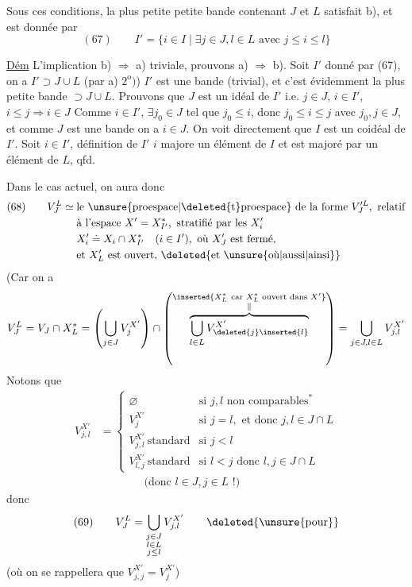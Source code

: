 Sous ces conditions,    la plus petite petite bande  contenant $J$ et $L$ satisfait b), et est donnée par
\[
(67)\qquad I'=\{i\in I\mid\exists j\in J,l\in L\text{ avec }j\leq i\leq l\}
\]

\uline{Dém} L'implication b) $\Rightarrow$ a) triviale,  prouvons a) $\Rightarrow$ b). Soit $I'$ donné par (67), on a $I'\supset J\cup L$ (par a) $2^{\mathrm o})$) $I'$ est une bande (trivial), et c'est évidemment la plus petite bande $\supset J\cup L$. Prouvons que $J$ est un idéal de $I'$ i.e. $j\in J$, $i\in I'$, $i\leq j\Rightarrow i\in J$ Comme $i\in I'$, $\exists j_0\in J$ tel que $j_0\leq i$, donc $j_0\leq i\leq j$ avec $j_0,j\in J$, et comme $J$ est une bande  on a $i\in J$. On voit directement que $I$ est un coidéal de $I'$. Soit $i\in I'$,   définition de $I'$ $i$ majore un élément de $I$ et est majoré par un élément de $L$, qfd.


Dans le cas actuel, on aura donc
\[
\begin{aligned}
(68)\qquad V_J^L\simeq{}&\text{le \unsure{proespace|\deleted{t}proespace} de la forme }V_J^{\prime L},\text{ relatif}\\
&\text{à l'espace }X'=X_{I'}^*,\text{ stratifié par les }X_i'\\
&X_i'\doteq X_i\cap X_{I'}^*\quad(i\in I'),\text{ où }X_J'\text{ est fermé,}\\
&\text{et }X_L'\text{ est ouvert, }\deleted{\text{et }\unsure{\text{où}|\text{aussi}|\text{ainsi}}}
\end{aligned}
\]
(Car on a
\[
V_J^L=V_J\cap X_L^*
=\left(\bigcup_{j\in J}V_j^{X'}\right)\cap
\left(\overbrace{\bigcup_{l\in L}V_{\deleted{j}\inserted{l}}^{X'}}^{\substack{\inserted{X_L^*\ \text{car }X_L^*\text{ ouvert dans }X'}\\\Vert}}\right)
=\bigcup_{j\in J,l\in L}V_{j,l}^{X'}
\]
Notons que
\[
\begin{aligned}
V_{j,l}^{X'}&=
\begin{cases}
\varnothing&\text{si }j,l\text{ non comparables}^*\\
V_j^{X'}&\text{si }j=l,\text{ et donc }j,l\in J\cap L\\
V_{j,l}^{X'}\ \text{standard}&\text{si }j<l\\
V_{l,j}^{X'}\ \text{standard}&\text{si }l<j\text{ donc }l,j\in J\cap L
\end{cases}\\
&\qquad\qquad\text{(donc }l\in J,j\in L\text{ !)}
\end{aligned}
\]
donc
\[
(69)\qquad V_J^L=\bigcup_{\substack{j\in J\\l\in L\\j\leq l}}V_{j,l}^{X'}\qquad\deleted{\text{\unsure{pour}}}
\]
(où on se rappellera que $V_{j,j}^{X'}=V_j^{X'}$)

